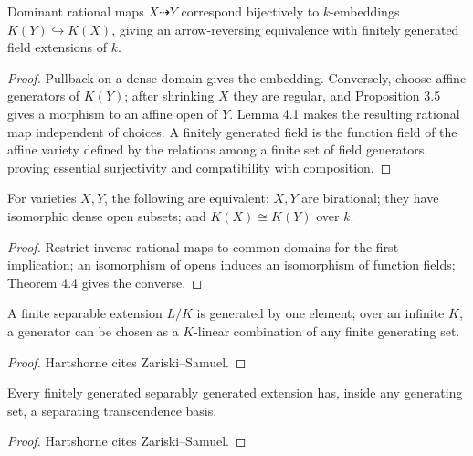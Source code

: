 \begin{theorem}
\label{thm:ha-ch1-4-4}
Dominant rational maps $X\dashrightarrow Y$ correspond bijectively to $k$-embeddings
$K(Y)\hookrightarrow K(X)$, giving an arrow-reversing equivalence with finitely generated field
extensions of $k$.
\end{theorem}
\begin{proof}
Pullback on a dense domain gives the embedding.  Conversely, choose affine generators of $K(Y)$;
after shrinking $X$ they are regular, and Proposition 3.5 gives a morphism to an affine open of
$Y$.  Lemma 4.1 makes the resulting rational map independent of choices.  A finitely generated
field is the function field of the affine variety defined by the relations among a finite set of
field generators, proving essential surjectivity and compatibility with composition.
\end{proof}

\begin{corollary}
\label{cor:ha-ch1-4-5}
For varieties $X,Y$, the following are equivalent: $X,Y$ are birational; they have isomorphic
dense open subsets; and $K(X)\cong K(Y)$ over $k$.
\end{corollary}
\begin{proof}
Restrict inverse rational maps to common domains for the first implication; an isomorphism of opens
induces an isomorphism of function fields; Theorem 4.4 gives the converse.
\end{proof}

\begin{theorem}
\label{thm:ha-ch1-4-6A}
A finite separable extension $L/K$ is generated by one element; over an infinite $K$, a generator
can be chosen as a $K$-linear combination of any finite generating set.
\end{theorem}
\begin{proof}
Hartshorne cites Zariski--Samuel.
\end{proof}

\begin{theorem}
\label{thm:ha-ch1-4-7A}
Every finitely generated separably generated extension has, inside any generating set, a separating
transcendence basis.
\end{theorem}
\begin{proof}
Hartshorne cites Zariski--Samuel.
\end{proof}

